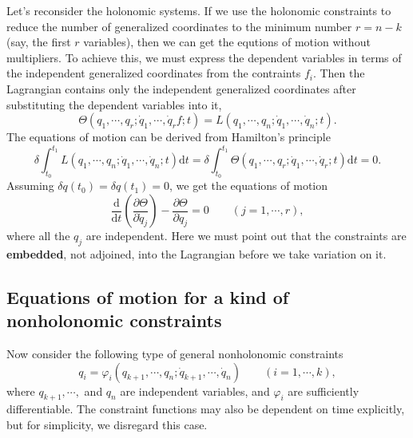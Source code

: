 \documentclass[preprint,11pt]{elsarticle}
\newcommand{\mathd}{\mathrm{d}}
\begin{document}
Let's reconsider the holonomic systems. If we use the holonomic constraints to
reduce the number of generalized coordinates to the minimum number $r = n -
k$(say, the first $r$ variables), then we can get the equtions of motion
without multipliers. To achieve this, we must express the dependent variables
in terms of the independent generalized coordinates from the contraints $f_i$.
Then the Lagrangian contains only the independent generalized coordinates
after substituting the dependent variables into it,
\[ \Theta ( q_1, \cdots, q_r ; \dot{q}_1, \cdots, \dot{q}_r f ; t) = L ( q_1,
   \cdots, q_n ; \dot{q}_1, \cdots, \dot{q}_n ; t) . \]
The equations of motion can be derived from Hamilton's principle
\[ \delta \int_{t_0}^{t_1} L ( q_1, \cdots, q_n ; \dot{q}_1, \cdots, \dot{q}_n
   ; t) \mathd t = \delta \int_{t_0}^{t_1} \Theta ( q_1, \cdots, q_r ;
   \dot{q}_1, \cdots, \dot{q}_r ; t) \mathd t = 0. \]
Assuming $\delta q ( t_0) = \delta q ( t_1) = 0$, we get the
equations of motion
\[ \frac{\mathd}{\mathd t} \left( \frac{\partial \Theta}{\partial \dot{q}_j}
   \right) - \frac{\partial \Theta}{\partial q_j} = 0 \hspace{2em} ( j = 1,
   \cdots, r), \]
where all the $q_j$ are independent. Here we must point out that the
constraints are \textbf{embedded}, not adjoined, into the Lagrangian
before we take variation on it.

\subsection{Equations of motion for a kind of nonholonomic constraints}
Now consider the following type of general nonholonomic constraints
\begin{equation}
  q_i = \varphi_i  ( q_{k + 1}, \cdots, q_n ; \dot{q}_{k + 1}, \cdots,
  \dot{q}_n) \hspace{2em} ( i = 1, \cdots, k), \label{constraint}
\end{equation}
where $q_{k + 1}, \cdots,$ and $q_n$ are independent variables, and
$\varphi_i$ are sufficiently differentiable.
The constraint functions may also be dependent on time explicitly, but for simplicity, we disregard this case.
\end{document}
